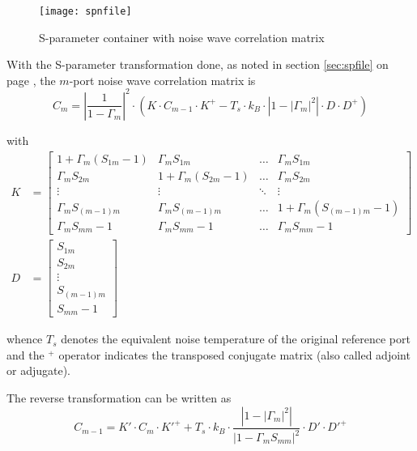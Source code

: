 \begin{figure}[ht]
\begin{center}
\texttt{[image: spnfile]}
\end{center}
\caption{S-parameter container with noise wave correlation matrix}
\label{fig:spnfile}
\end{figure}
\FloatBarrier

With the S-parameter transformation done, as noted in section
\ref{sec:spfile} on page \pageref{sec:spfile}, the $m$-port noise wave
correlation matrix is
\begin{equation}
C_m = \left|\dfrac{1}{1 - \Gamma_m}\right|^2 \cdot \left(K\cdot C_{m-1}\cdot K^+ -T_s\cdot k_B \cdot\left|1 - \left|\Gamma_m\right|^2\right|\cdot D\cdot D^+\right)
\end{equation}

with
\begin{align}
K &=
\begin{bmatrix}
1 + \Gamma_m\left(S_{1m} -1\right) & \Gamma_m S_{1m} & \ldots & \Gamma_m S_{1m}\\
\Gamma_m S_{2m} & 1 + \Gamma_m\left(S_{2m} -1\right) & \ldots & \Gamma_m S_{2m}\\
\vdots & \vdots & \ddots & \vdots\\
\Gamma_m S_{(m-1)m} & \Gamma_m S_{(m-1)m} & \ldots & 1 + \Gamma_m\left(S_{(m-1)m} -1\right)\\
\Gamma_m S_{mm} - 1 & \Gamma_m S_{mm} - 1 & \ldots & \Gamma_m S_{mm} - 1
\end{bmatrix}\\
D &=
\begin{bmatrix}
S_{1m}\\
S_{2m}\\
\vdots\\
S_{(m-1)m}\\
S_{mm} - 1
\end{bmatrix}
\end{align}

whence $T_s$ denotes the equivalent noise temperature of the original
reference port and the $ ^{+}$ operator indicates the transposed
conjugate matrix (also called adjoint or adjugate).

\addvspace{12pt}

The reverse transformation can be written as
\begin{equation}
C_{m-1} = K'\cdot C_m\cdot K'^+ +T_s\cdot k_B \cdot\dfrac{\left|1 - \left|\Gamma_m\right|^2\right|}{\left|1 - \Gamma_m S_{mm}\right|^2}\cdot D'\cdot D'^+
\end{equation}

